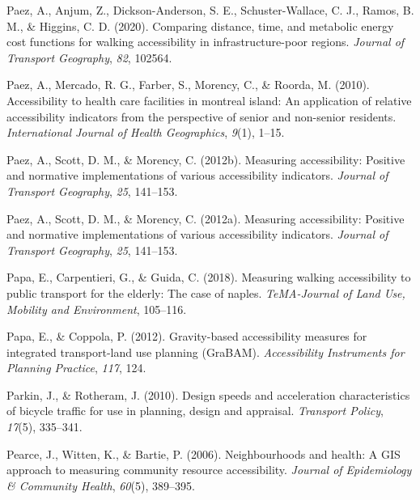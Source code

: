 \documentclass[12pt,twoside]{reedthesis}
\newlength{\cslhangindent}
\newenvironment{CSLReferences}[2] %
 {%
  \setlength{\parindent}{0pt}
  \ifodd #1 \everypar{\setlength{\hangindent}{\cslhangindent}}\ignorespaces\fi
  \ifnum #2 > 0
  \setlength{\parskip}{#2\baselineskip}
  \fi
 }%
 {}
\begin{document}
\begin{CSLReferences}{1}{0}
\leavevmode{}%
Paez, A., Anjum, Z., Dickson-Anderson, S. E., Schuster-Wallace, C. J., Ramos, B. M., \& Higgins, C. D. (2020). Comparing distance, time, and metabolic energy cost functions for walking accessibility in infrastructure-poor regions. \emph{Journal of Transport Geography}, \emph{82}, 102564.

\leavevmode{}%
Paez, A., Mercado, R. G., Farber, S., Morency, C., \& Roorda, M. (2010). Accessibility to health care facilities in montreal island: An application of relative accessibility indicators from the perspective of senior and non-senior residents. \emph{International Journal of Health Geographics}, \emph{9}(1), 1--15.

\leavevmode{}%
Paez, A., Scott, D. M., \& Morency, C. (2012b). Measuring accessibility: Positive and normative implementations of various accessibility indicators. \emph{Journal of Transport Geography}, \emph{25}, 141--153.

\leavevmode{}%
Paez, A., Scott, D. M., \& Morency, C. (2012a). Measuring accessibility: Positive and normative implementations of various accessibility indicators. \emph{Journal of Transport Geography}, \emph{25}, 141--153.

\leavevmode{}%
Papa, E., Carpentieri, G., \& Guida, C. (2018). Measuring walking accessibility to public transport for the elderly: The case of naples. \emph{TeMA-Journal of Land Use, Mobility and Environment}, 105--116.

\leavevmode{}%
Papa, E., \& Coppola, P. (2012). Gravity-based accessibility measures for integrated transport-land use planning (GraBAM). \emph{Accessibility Instruments for Planning Practice}, \emph{117}, 124.

\leavevmode{}%
Parkin, J., \& Rotheram, J. (2010). Design speeds and acceleration characteristics of bicycle traffic for use in planning, design and appraisal. \emph{Transport Policy}, \emph{17}(5), 335--341.

\leavevmode{}%
Pearce, J., Witten, K., \& Bartie, P. (2006). Neighbourhoods and health: A GIS approach to measuring community resource accessibility. \emph{Journal of Epidemiology \& Community Health}, \emph{60}(5), 389--395.


\end{CSLReferences}
\end{document}
